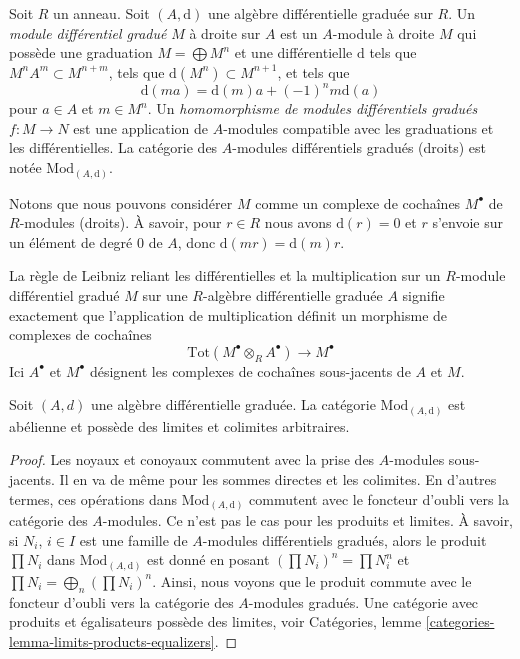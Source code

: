 \begin{definition}
\label{definition-dgm}
Soit $R$ un anneau.
Soit $(A, \text{d})$ une algèbre différentielle graduée sur $R$.
Un {\it module différentiel gradué} $M$ à droite sur $A$ est un $A$-module à droite
$M$ qui possède une graduation $M = \bigoplus M^n$ et une différentielle
$\text{d}$ tels que $M^n A^m \subset M^{n + m}$, tels que
$\text{d}(M^n) \subset M^{n + 1}$, et tels que
$$
\text{d}(ma) = \text{d}(m)a + (-1)^n m\text{d}(a)
$$
pour $a \in A$ et $m \in M^n$. Un
{\it homomorphisme de modules différentiels gradués} $f : M \to N$ est une
application de $A$-modules compatible avec les graduations et les
différentielles. La catégorie des $A$-modules différentiels gradués (droits) est
notée $\text{Mod}_{(A, \text{d})}$.
\end{definition}

\noindent
Notons que nous pouvons considérer $M$ comme un complexe de cochaînes
$M^\bullet$ de $R$-modules (droits). À savoir, pour $r \in R$ nous avons $\text{d}(r)
= 0$ et $r$ s'envoie sur un élément de degré $0$ de $A$,
donc $\text{d}(mr) = \text{d}(m)r$.

\medskip\noindent
La règle de Leibniz reliant les différentielles et la multiplication sur un $R$-module
différentiel gradué $M$ sur une $R$-algèbre différentielle graduée $A$ signifie
exactement que l'application de multiplication définit un morphisme de complexes de cochaînes
$$
\text{Tot}(M^\bullet \otimes_R A^\bullet) \to M^\bullet
$$
Ici $A^\bullet$ et $M^\bullet$ désignent les complexes de cochaînes
sous-jacents de $A$ et $M$.

\begin{lemma}
\label{lemma-dgm-abelian}
Soit $(A, d)$ une algèbre différentielle graduée. La catégorie
$\text{Mod}_{(A, \text{d})}$ est abélienne et possède des limites et colimites arbitraires.
\end{lemma}

\begin{proof}
Les noyaux et conoyaux commutent avec la prise des $A$-modules
sous-jacents. Il en va de même pour les sommes directes et les colimites. En d'autres
termes, ces opérations dans $\text{Mod}_{(A, \text{d})}$ commutent avec le foncteur
d'oubli vers la catégorie des $A$-modules. Ce n'est pas le cas pour les
produits et limites. À savoir, si $N_i$, $i \in I$ est
une famille de $A$-modules différentiels gradués, alors le produit
$\prod N_i$ dans $\text{Mod}_{(A, \text{d})}$ est donné en posant $(\prod N_i)^n = \prod
N_i^n$ et $\prod N_i = \bigoplus_n (\prod N_i)^n$. Ainsi, nous voyons que le produit
commute avec le foncteur d'oubli vers la catégorie des $A$-modules gradués. Une
catégorie avec produits et égalisateurs possède des limites, voir
Catégories, lemme \ref{categories-lemma-limits-products-equalizers}.
\end{proof}

